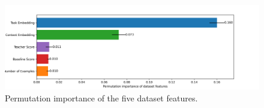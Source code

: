 \documentclass[11pt]{article}
\begin{document}
\begin{figure}[!tb]
    \centering
  \includegraphics[width=0.6\linewidth]{pics/permutation_importance.png}
  \caption{Permutation importance of the five dataset features.}
  \label{fig:permutation}
\end{figure}
\end{document}
